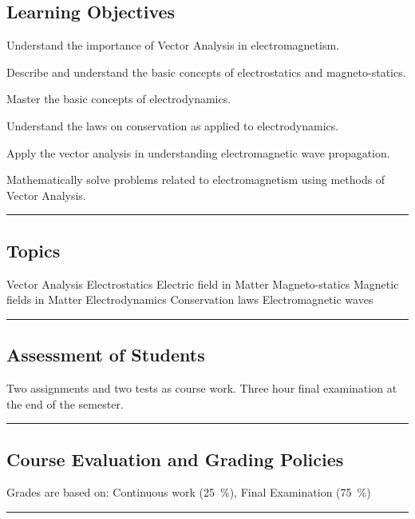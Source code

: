 \subsection*{Learning Objectives}
\begin{outline}
    \1 Understand the importance of Vector Analysis in electromagnetism.

    \1 Describe and understand the basic concepts of electrostatics and magneto-statics.

    \1 Master the basic concepts of electrodynamics.

    \1 Understand the laws on conservation as applied to electrodynamics.

    \1 Apply the vector analysis in understanding electromagnetic wave propagation.

    \1 Mathematically solve problems related to electromagnetism using methods of Vector Analysis.

\end{outline}
\vspace{2ex}\hrule\vspace{2ex}

\subsection*{Topics}
\begin{outline}
    \1 Vector Analysis
    \1 Electrostatics
    \1 Electric field in Matter
    \1 Magneto-statics
    \1 Magnetic fields in Matter
    \1 Electrodynamics
    \1 Conservation laws
    \1 Electromagnetic waves
\end{outline}
\vspace{2ex} \hrule\vspace{2ex}

\subsection*{Assessment of Students}
Two assignments and two tests as course work.
Three hour final examination at the end of the semester.
\vspace{2ex}\hrule\vspace{2ex}

\subsection*{Course Evaluation and Grading Policies}
Grades are based on:
Continuous work (\qty{25}{\percent}),
Final Examination (\qty{75}{\percent})
\vspace{2ex}\hrule\vspace{2ex}

